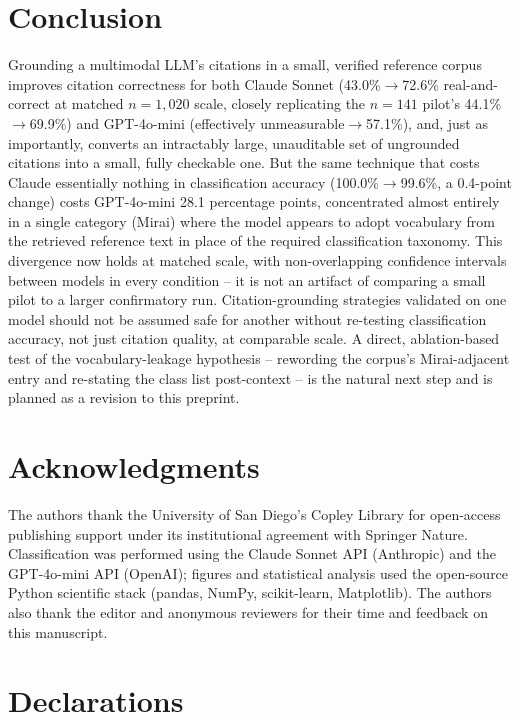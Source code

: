 \documentclass[10pt,twocolumn]{article}
\begin{document}
\section{Conclusion}

Grounding a multimodal LLM's citations in a small, verified reference corpus improves citation
correctness for both Claude Sonnet (43.0\%$\to$72.6\% real-and-correct at matched $n=1{,}020$
scale, closely replicating the $n=141$ pilot's 44.1\%$\to$69.9\%) and GPT-4o-mini (effectively
unmeasurable$\to$57.1\%), and, just as importantly, converts an intractably large, unauditable set
of ungrounded citations into a small, fully checkable one. But the same technique that costs
Claude essentially nothing in classification accuracy (100.0\%$\to$99.6\%, a 0.4-point change)
costs GPT-4o-mini 28.1 percentage points, concentrated almost entirely in a single category
(Mirai) where the model appears to adopt vocabulary from the retrieved reference text in place of
the required classification taxonomy. This divergence now holds at matched scale, with
non-overlapping confidence intervals between models in every condition -- it is not an artifact of
comparing a small pilot to a larger confirmatory run. Citation-grounding strategies validated on
one model should not be assumed safe for another without re-testing classification accuracy, not
just citation quality, at comparable scale. A direct, ablation-based test of the
vocabulary-leakage hypothesis -- rewording the corpus's Mirai-adjacent entry and re-stating the
class list post-context -- is the natural next step and is planned as a revision to this
preprint.

\section*{Acknowledgments}

The authors thank the University of San Diego's Copley Library for open-access publishing
support under its institutional agreement with Springer Nature. Classification was performed
using the Claude Sonnet API (Anthropic) and the GPT-4o-mini API (OpenAI); figures and statistical
analysis used the open-source Python scientific stack (pandas, NumPy, scikit-learn, Matplotlib).
The authors also thank the editor and anonymous reviewers for their time and feedback on this
manuscript.

\section*{Declarations}
\end{document}
